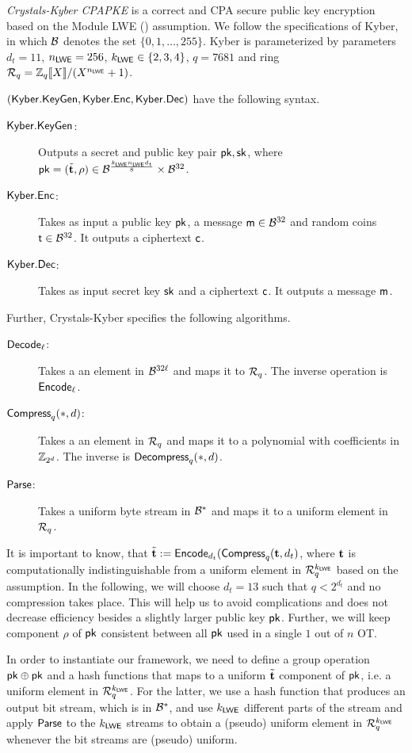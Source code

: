 \begin{definition}
\emph{ Crystals-Kyber CPAPKE} is a correct and CPA secure public key encryption based on the Module LWE (\MLWE) assumption. We follow the specifications of Kyber, in which $\mathcal{B}$ denotes the  set $\{0,1,\ldots,255\}$. Kyber is parameterized by parameters $d_t=11$, $n_{\mathsf{LWE}}=256$, $k_{\mathsf{LWE}}\in\{2,3,4\}$, $q=7681$ and ring $\mathcal R_q=\mathbb Z_q\llbracket X\rrbracket/(X^{n_{\mathsf{LWE}}}+1)$. 

$(\mathsf{Kyber.KeyGen},\mathsf{Kyber.Enc},\mathsf{Kyber.Dec})$ have the following syntax. 
\begin{description}
\item[$\mathsf{Kyber.KeyGen}$:] Outputs a secret and public key pair $\mathsf{pk},\mathsf{sk}$, where $\mathsf{pk}=(\tilde{{\mathbf t}},\rho)\in\mathcal{B}^{\frac{k_{\mathsf{LWE}}n_{\mathsf{LWE}} d_t}{8}}\times\mathcal{B}^{32}$.
\item[$\mathsf{Kyber.Enc}$:] Takes as input a public key $\mathsf{pk}$, a message $\mathsf{m}\in\mathcal{B}^{32}$ and random coins $\mathsf{t}\in\mathcal{B}^{32}$. It outputs a ciphertext $\mathsf{c}$.
\item[$\mathsf{Kyber.Dec}$:] Takes as input secret key $\mathsf{sk}$ and a ciphertext $\mathsf{c}$. It outputs a message $\mathsf{m}$.
\end{description}
Further, Crystals-Kyber specifies the following algorithms.
\begin{description}
\item[$\mathsf{Decode}_\ell$:] Takes a an element in $\mathcal{B}^{32\ell}$ and maps it to $\mathcal R_q$. The inverse operation is $\mathsf{Encode}_\ell$.
\item[$\mathsf{Compress}_q(*,d)$:] Takes a an element in $\mathcal R_q$ and maps it to a polynomial with coefficients in $\mathbb Z_{2^d}$. The inverse is $\mathsf{Decompress}_q(*,d)$.
\item[$\mathsf{Parse}$:] Takes a uniform byte stream in $\mathcal{B}^{*}$ and maps it to a uniform element in $\mathcal R_q$.
\end{description}
\end{definition}

It is important to know, that $\tilde{{\mathbf t}}:=\mathsf{Encode}_{d_t}(\mathsf{Compress}_q({\mathbf t}, d_t)$, where ${\mathbf t}$ is computationally indistinguishable from a uniform element in $\mathcal R_q^{k_{\mathsf{LWE}}}$ based on the \MLWE assumption. In the following, we will choose $d_t=13$ such that $q<2^{d_t}$ and no compression takes place. This will help us to avoid complications and does not decrease efficiency besides a slightly larger public key $\mathsf{pk}$. Further, we will keep component $\rho$ of $\mathsf{pk}$ consistent between all $\mathsf{pk}$ used in a single $1$ out of $n$ OT.

In order to instantiate our framework, we need to define a group operation $\mathsf{pk}\oplus\mathsf{pk}$ and a hash functions that maps to a uniform $\tilde{{\mathbf t}}$ component of $\mathsf{pk}$, i.e. a uniform element in $\mathcal R_q^{k_{\mathsf{LWE}}}$. For the latter, we use a hash function that produces an output bit stream, which is in $\mathcal{B}^{*}$, and use $k_{\mathsf{LWE}}$ different parts of the stream and apply $\mathsf{Parse}$ to the $k_{\mathsf{LWE}}$ streams to obtain a (pseudo) uniform element in $\mathcal R_q^{k_{\mathsf{LWE}}}$ whenever the bit streams are (pseudo) uniform.

